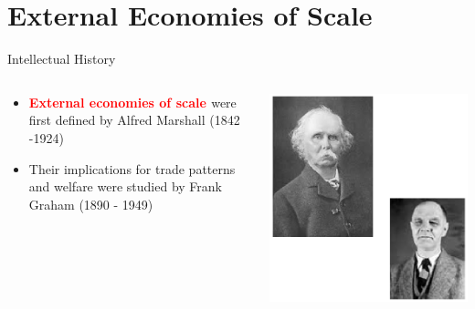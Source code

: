 \documentclass[10pt,hyperref={CJKbookmarks=true},xcolor=dvipsnames,aspectratio=169]{beamer}
\begin{document}
\section{External Economies of Scale }
\begin{frame}{Intellectual History}


\begin{columns}[onlytextwidth]
\begin{column}{0.4\textwidth}
\begin{itemize}
\item \textbf{\textcolor{red}{External economies of scale }}were first defined
by Alfred Marshall (1842 -1924) 
\item Their implications for trade patterns and welfare were studied by
Frank Graham (1890 - 1949) 
\end{itemize}

\end{column}
\begin{column}{0.6\textwidth}
\includegraphics[width=0.8\columnwidth]{fig/krugman/lec6-5}
\end{column}
\end{columns}

\end{frame}
\end{document}
